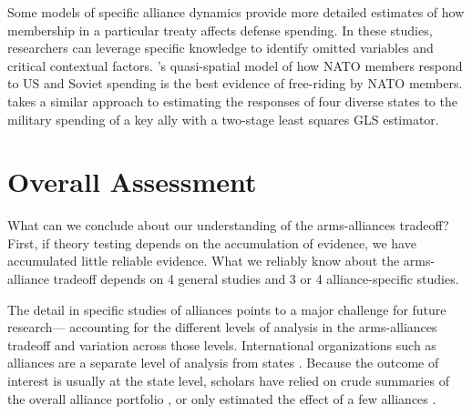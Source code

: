 \documentclass[12pt]{article}
\begin{document}
Some models of specific alliance dynamics provide more detailed estimates of how membership in a particular treaty affects defense spending. In these studies, researchers can leverage specific knowledge to identify omitted variables and critical contextual factors. \citet{PluemperNeumayer2015}'s quasi-spatial model of how NATO members respond to US and Soviet spending is the best evidence of free-riding by NATO members. \citet{Sorokin1994} takes a similar approach to estimating the responses of four diverse states to the military spending of a key ally with a two-stage least squares GLS estimator. 



\section*{Overall Assessment}

What can we conclude about our understanding of the arms-alliances tradeoff? First, if theory testing depends on the accumulation of evidence, we have accumulated little reliable evidence. What we reliably know about the arms-alliance tradeoff depends on 4 general studies and 3 or 4 alliance-specific studies. 

The detail in specific studies of alliances points to a major challenge for future research--- accounting for the different levels of analysis in the arms-alliances tradeoff and variation across those levels. International organizations such as alliances are a separate level of analysis from states \citep{Mattes2012, Chibaetal2015}. Because the outcome of interest is usually at the state level, scholars have relied on crude summaries of the overall alliance portfolio \citep{Conybeare1992}, or only estimated the effect of a few alliances \citep{OnealWhatley1996}. 






  
% 
\end{document}
